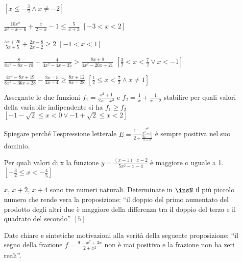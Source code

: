 \begin{esercizio}[\Ast]
\begin{enumeratea}
 \hfill \(\left[x\le -\frac 3 2 \wedge x \neq -2\right]\)
\item \(\frac{10x^2}{x^2+x-6}+\frac x{2-x}-1\le \frac 5{x+3}\) 
 \hfill \(\left[-3<x<2\right]\)
\item \(\frac{5x+20}{5x+5}+\frac{2x-8}{2x-2}\ge 2\) 
 \hfill \(\left[-1<x<1\right]\)
\item \(\frac 8{8x^2-8x-70}-\frac 4{4x^2-4x-35}>\frac{8x+8}{4x^2-20x+21}\)
 \hfill \(\left[\frac 3 2<x<\frac 7 2\vee x<-1\right]\)
\item \(\frac{4x^2-8x+19}{8x^2-36x+28}-\frac{2x-5}{4x-4}\ge \frac{8x+12}{8x-28}\)
 \hfill \(\left[\frac 1 2\le x<\frac 7 2 \wedge x \neq 1\right]\)
\end{enumeratea}
\end{esercizio}

\begin{esercizio}[\Ast]
 \label{ese:4.68}
Assegnate le due funzioni \(f_1=\frac{x^2+1}{2x-x^2}\) e \(f_2=\frac 1 x+\frac 
1{x-2}\) stabilire per quali valori della variabile indipendente si ha \(f_1\ge 
f_2\)
 \hfill \(\left[-1-\sqrt 2\le x<0\vee -1+\sqrt 2\le x<2\right]\)
\end{esercizio}

\begin{esercizio}
 \label{ese:4.69}
Spiegare perché l'espressione letterale 
\(E=\frac{1-\frac{x^2}{x^2-1}}{2+\frac{3x-1}{1-x}}\) è sempre positiva nel suo 
dominio.
\end{esercizio}

\begin{esercizio}[\Ast]
 \label{ese:4.70}
Per quali valori di x la funzione \(y=\frac{(x-1)\cdot x-2}{5x^2-x-4}\) è maggiore 
o uguale a 1.
 \hfill \(\left[-\frac 3 2\le x<-\frac 4 5\right]\)
\end{esercizio}

\begin{esercizio}[\Ast]
 \label{ese:4.71}
\( x \), \( x+2 \), \( x+4 \) sono tre numeri naturali. Determinate in \( \insN \) il 
più piccolo numero che rende vera la proposizione: ``il doppio del primo 
aumentato del prodotto degli altri due è maggiore della differenza tra il doppio 
del terzo e il quadrato del secondo''
 \hfill \(\left[5\right]\)
\end{esercizio}

\begin{esercizio}
 \label{ese:4.72}
Date chiare e sintetiche motivazioni alla verità della seguente proposizione: 
``il segno della frazione \(f=\frac{9-x^2+3x}{2+x^2}\) non è mai positivo e la 
frazione non ha zeri reali''.
\end{esercizio}

